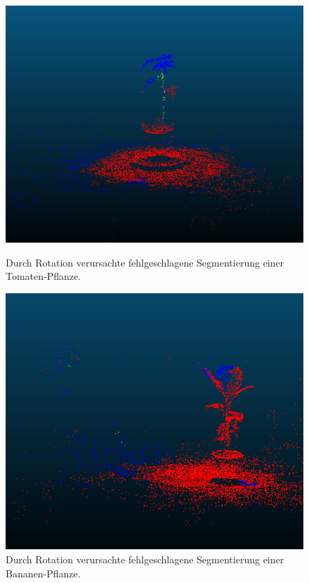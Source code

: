 \documentclass[12pt,titlepage, twoside]{article}
\begin{document}
\begin{figure}
    \centering
    \begin{minipage}{0.45\textwidth}
        \centering
        \includegraphics[width=1.0\textwidth]{./Images/RotationError1.png}
        \caption{Durch Rotation verursachte fehlgeschlagene Segmentierung einer Tomaten-Pflanze.}
        \label{fig:rotation:error:1}
    \end{minipage}\hfill
    \begin{minipage}{0.45\textwidth}
        \centering
        \includegraphics[width=1.0\textwidth]{./Images/RotationError2.png}
        \caption{Durch Rotation verursachte fehlgeschlagene Segmentierung einer Bananen-Pflanze.}
        \label{fig:rotation:error:2}
    \end{minipage}
\end{figure}
\end{document}
